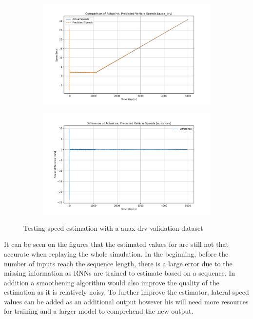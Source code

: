 \begin{figure}[htbp]
    \centering

    \begin{subfigure}{1\textwidth}
        \centering
        \includegraphics[width=\linewidth]{images/RNN_results/model_0_auax_drv_act_vs_predicted_speed.png}
    \end{subfigure}
    \hfill
    \begin{subfigure}{1\textwidth}
        \centering
        \includegraphics[width=\linewidth]{images/RNN_results/model_0_auax_drv_act_vs_predicted_speed_diff.png}
    \end{subfigure}
    \caption{Testing speed estimation with a auax-drv validation dataset}
    \label{fig:rnn_results_auax_drv}
\end{figure}
\FloatBarrier

It can be seen on the figures that the estimated values for are still not that accurate when replaying the whole simulation. In the beginning, before the number of inputs reach the sequence length, there is a large error due to the missing information as RNNs are trained to estimate based on a sequence. In addition a smoothening algorithm would also improve the quality of the estimation as it is relatively noisy. To further improve the estimator, lateral speed values can be added as an additional output however his will need more resources for training and a larger model to comprehend the new output.  


